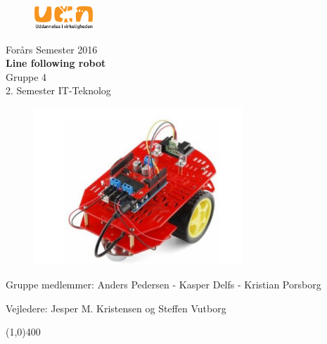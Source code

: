 \clearpage
\thispagestyle{empty}

\begin{figure}[H]
	\raggedleft
		\includegraphics[width=0.2\textwidth]{figures/logo-ucn.png}
\end{figure}
\vspace*{\fill} 
\begin{center}
\begin{Huge}
Forårs Semester 2016\\
\vspace{5 mm}
\textbf{Line following robot}\\
\vspace{3 mm}
Gruppe 4\\
\vspace{3 mm}
2. Semester IT-Teknolog
\end{Huge}
\end{center}

\begin{figure}[h!]
  \centering
  \includegraphics[width=0.7\textwidth]{figures/Produktet.png}
\end{figure}

\vspace*{\fill}
\begin{center}
Gruppe medlemmer:
 Anders Pedersen - Kasper Delfs - Kristian Porsborg
\end{center}
\begin{center}
Vejledere: Jesper M. Kristensen og Steffen Vutborg
\end{center}
\begin{center}
\line(1,0){400}
\end{center}